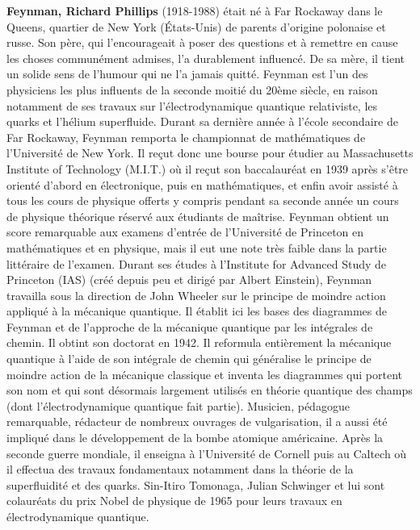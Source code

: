 \textbf{Feynman, Richard Phillips} (1918-1988) était né à Far Rockaway dans le Queens, quartier de New York (États-Unis) de parents d'origine polonaise et russe. Son père, qui l'encourageait à poser des questions et à remettre en cause les choses communément admises, l'a durablement influencé. De sa mère, il tient un solide sens de l'humour qui ne l'a jamais quitté. Feynman est l'un des physiciens les plus influents de la seconde moitié du 20ème siècle, en raison notamment de ses travaux sur l'électrodynamique quantique relativiste, les quarks et l'hélium superfluide. Durant sa dernière année à l'école secondaire de Far Rockaway, Feynman remporta le championnat de mathématiques de l'Université de New York. Il reçut donc une bourse pour étudier au Massachusetts Institute of Technology (M.I.T.) où il reçut son baccalauréat en 1939 après s'être orienté d'abord en électronique, puis en mathématiques, et enfin avoir assisté à tous les cours de physique offerts y compris pendant sa seconde année un cours de physique théorique réservé aux étudiants de maîtrise. Feynman obtient un score remarquable aux examens d'entrée de l'Université de Princeton en mathématiques et en physique, mais il eut une note très faible dans la partie littéraire de l'examen. Durant ses études à l'Institute for Advanced Study de Princeton (IAS) (créé depuis peu et dirigé par Albert Einstein), Feynman travailla sous la direction de John Wheeler sur le principe de moindre action appliqué à la mécanique quantique. Il établit ici les bases des diagrammes de Feynman et de l'approche de la mécanique quantique par les intégrales de chemin. Il obtint son doctorat en 1942. Il reformula entièrement la mécanique quantique à l'aide de son intégrale de chemin qui généralise le principe de moindre action de la mécanique classique et inventa les diagrammes qui portent son nom et qui sont désormais largement utilisés en théorie quantique des champs (dont l'électrodynamique quantique fait partie). Musicien, pédagogue remarquable, rédacteur de nombreux ouvrages de vulgarisation, il a aussi été impliqué dans le développement de la bombe atomique américaine. Après la seconde guerre mondiale, il enseigna à l'Université de Cornell puis au Caltech où il effectua des travaux fondamentaux notamment dans la théorie de la superfluidité et des quarks. Sin-Itiro Tomonaga, Julian Schwinger et lui sont colauréats du prix Nobel de physique de 1965 pour leurs travaux en électrodynamique quantique.

